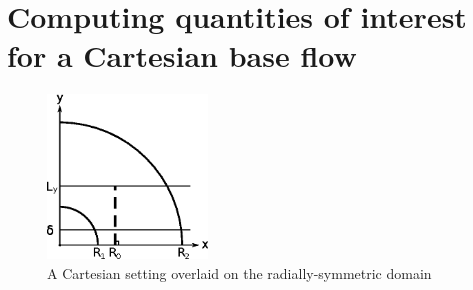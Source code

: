 \documentclass[letterpaper,11pt,nointlimits,reqno]{amsart}
\begin{document}
\clearpage

\section{Computing quantities of interest for a Cartesian base flow}

\begin{figure}[h]
  \centering
  \includegraphics[width=0.38\textwidth]{nozzle_schematic}
  \caption{
      \label{fig:mapping_geometry}
      A Cartesian setting overlaid on the radially-symmetric domain
  }
\end{figure}
\end{document}
